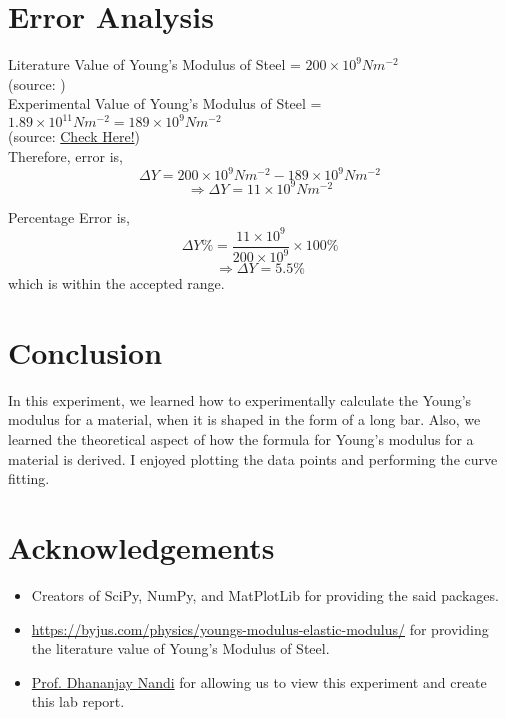 \documentclass[12pt]{article}
\begin{document}
	\section{Error Analysis}
	\label{sec:error}
	
	Literature Value of Young's Modulus of Steel = $200 \times 10^{9}Nm^{-2}$\\ (source: \href{https://byjus.com/physics/youngs-modulus-elastic-modulus/}{\color{purple}{Click Here!}} )\\
	Experimental Value of Young's Modulus of Steel = $1.89 \times 10^{11} Nm^{-2} = 189 \times 10^{9}Nm^{-2}$\\ (source: \hyperref[sec:calc]{\color{purple}Check Here!})\\
	
	Therefore, error is,
	$$\Delta Y = 200 \times 10^{9}Nm^{-2} - 189 \times 10^{9}Nm^{-2}$$
	$$\Rightarrow \Delta Y = 11 \times 10^{9}Nm^{-2}$$
	
	\pagebreak
	
	Percentage Error is,
	$$\Delta Y \% = \dfrac{11 \times 10^{9}}{200 \times 10^{9}} \times 100 \%$$
	$$\Rightarrow \Delta Y = 5.5 \%$$
	which is within the accepted range.
	
	\section{Conclusion}
	
	In this experiment, we learned how to experimentally calculate the Young's modulus for a material, when it is shaped in the form of a long bar. Also, we learned the theoretical aspect of how the formula for Young's modulus for a material is derived. I enjoyed plotting the data points and performing the curve fitting.
	
	\section{Acknowledgements}
	
	\begin{itemize}
		\item Creators of SciPy, NumPy, and MatPlotLib for providing the said packages.
		\item \url{https://byjus.com/physics/youngs-modulus-elastic-modulus/} for providing the literature value of Young's Modulus of Steel.
		\item \href{mailto:dhananjay@iiserkol.ac.in}{\color{purple}Prof. Dhananjay Nandi} for allowing us to view this experiment and create this lab report.
	\end{itemize}
\end{document}
